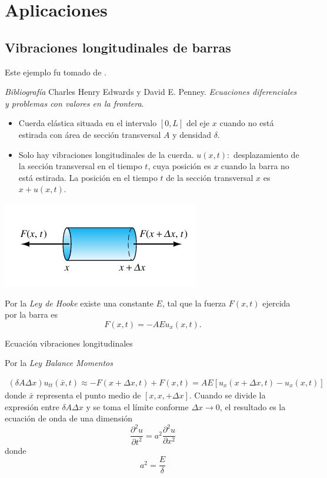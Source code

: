 \section{Aplicaciones}

\subsection{Vibraciones longitudinales de barras}

Este ejemplo fu tomado de \cite{C.HenryEdwards482}.

\emph{Bibliografía}
Charles Henry Edwards y David E. Penney. \emph{Ecuaciones diferenciales y problemas con valores en la frontera}.


\begin{itemize}
    \item Cuerda elástica situada en el intervalo $[0,L]$ del eje $x$ cuando no está estirada con área de sección transversal $A$ y densidad $\delta$.
    \item Solo hay vibraciones longitudinales de la cuerda. $u(x, t):$  desplazamiento de la sección transversal  en el tiempo $t$, cuya posición es $x$ cuando la barra no está estirada. La posición en el tiempo $t$ de la sección transversal $x$ es $x+u(x, t)$.
\end{itemize}


\begin{center}
\includegraphics[scale=.5]{imagenes/barra.png}
\end{center}



Por la \emph{Ley de Hooke} existe una constante $E$, tal que la fuerza $F(x, t)$ ejercida por la barra   es
$$
F(x, t)=-A E u_{x}(x, t).
$$
 

 
{Ecuación vibraciones longitudinales}

Por la \emph{Ley Balance Momentos}

$$
\begin{aligned}
(\delta A \Delta x) u_{t t}(\bar{x}, t)  \approx-F(x+\Delta x, t)+F(x, t) 
=A E\left[u_{x}(x+\Delta x, t)-u_{x}(x, t)\right]
\end{aligned}
$$
donde $\bar{x}$ representa el punto medio de $[x, x,+\Delta x]$. Cuando se divide la expresión entre $\delta A \Delta x$ y se toma el límite conforme $\Delta x \rightarrow 0$, el resultado es la ecuación de onda de una dimensión
$$
\frac{\partial^{2} u}{\partial t^{2}}=a^{2} \frac{\partial^{2} u}{\partial x^{2}}
$$
donde
$$
a^{2}=\frac{E}{\delta}
$$


